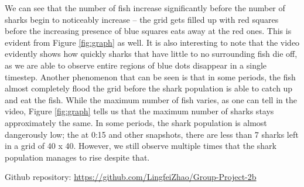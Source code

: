 \documentclass{article}
\begin{document}
We can see that the number of fish increase significantly before the number of sharks begin to noticeably increase -- the grid gets filled up with red squares before the increasing presence of blue squares eats away at the red ones. This is evident from Figure \ref{fig:graph} as well. It is also interesting to note that the video evidently shows how quickly sharks that have little to no surrounding fish die off, as we are able to observe entire regions of blue dots disappear in a single timestep. Another phenomenon that can be seen is that in some periods, the fish almost completely flood the grid before the shark population is able to catch up and eat the fish. While the maximum number of fish varies, as one can tell in the video, Figure \ref{fig:graph} tells us that the maximum number of sharks stays approximately the same. In some periods, the shark population is almost dangerously low; the at 0:15 and other snapshots, there are less than 7 sharks left in a grid of
40 x 40. However, we still observe multiple times that the shark population manages to rise despite that.

\noindent Github repository: \url{https://github.com/LingfeiZhao/Group-Project-2b}
\end{document}
